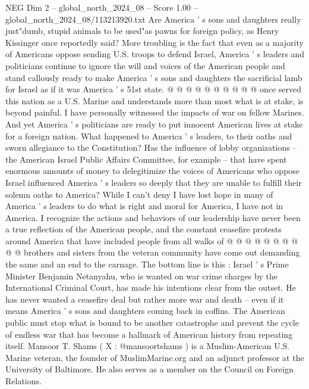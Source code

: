 \begin{textsample}{NEG Dim 2 – global\_north\_2024\_08 – Score 1.00 – global\_north\_2024\_08/113213920.txt}
Are America ' s sons and daughters really just"dumb, stupid animals to be used"as pawns for foreign policy, as Henry Kissinger once reportedly said?
More troubling is the fact that even as a majority of Americans oppose sending U.S. troops to defend Israel, America ' s leaders and politicians continue to ignore the will and voices of the American people and stand callously ready to make America ' s sons and daughters the sacrificial lamb for Israel as if it was America ' s 51st state. @ @ @ @ @ @ @ @ @ @ once served this nation as a U.S.
Marine and understands more than most what is at stake, is beyond painful.
I have personally witnessed the impacts of war on fellow Marines.
And yet America ' s politicians are ready to put innocent American lives at stake for a foreign nation.
What happened to America ' s leaders, to their oaths and sworn allegiance to the Constitution?
Has the influence of lobby organizations -- the American Israel Public Affairs Committee, for example -- that have spent enormous amounts of money to delegitimize the voices of Americans who oppose Israel influenced America ' s leaders so deeply that they are unable to fulfill their solemn oaths to America?
While I can't deny I have lost hope in many of America ' s leaders to do what is right and moral for America, I have not in America.
I recognize the actions and behaviors of our leadership have never been a true reflection of the American people, and the constant ceasefire protests around America that have included people from all walks of @ @ @ @ @ @ @ @ @ @ brothers and sisters from the veteran community have come out demanding the same and an end to the carnage.
The bottom line is this : Israel ' s Prime Minister Benjamin Netanyahu, who is wanted on war crime charges by the International Criminal Court, has made his intentions clear from the outset.
He has never wanted a ceasefire deal but rather more war and death -- even if it means America ' s sons and daughters coming back in coffins.
The American public must stop what is bound to be another catastrophe and prevent the cycle of endless war that has become a hallmark of American history from repeating itself.
Mansoor T.
Shams ( X : @mansoortshams ) is a Muslim-American U.S.
Marine veteran, the founder of MuslimMarine.org and an adjunct professor at the University of Baltimore.
He also serves as a member on the Council on Foreign Relations.

\end{textsample}
